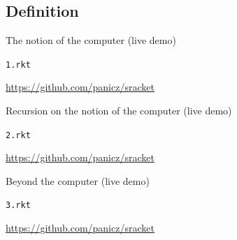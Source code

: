 \documentclass{beamer}
\begin{document}
\subsection{Definition}



\begin{frame}{The notion of the computer (live demo)}
  \begin{center}
    \Huge
    \texttt{1.rkt}
  \end{center}
  \url{https://github.com/panicz/sracket}
\end{frame}



\begin{frame}{Recursion on the notion of the computer (live demo)}
  \begin{center}
    \Huge
    \texttt{2.rkt}
  \end{center}
  \url{https://github.com/panicz/sracket}
\end{frame}



\begin{frame}{Beyond the computer (live demo)}
  \begin{center}
    \Huge
    \texttt{3.rkt}
  \end{center}
  \url{https://github.com/panicz/sracket}
\end{frame}



{ %
  \begin{frame}[plain]
  \end{frame}
}
\end{document}
